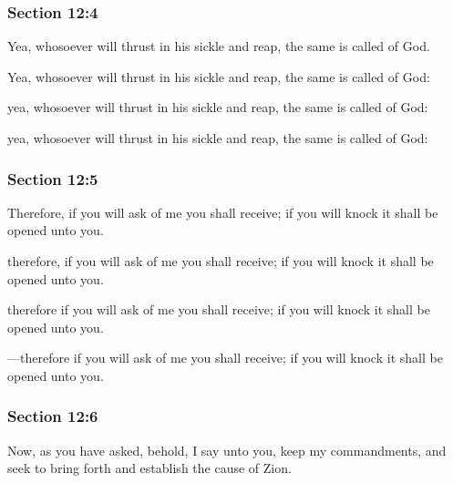 	\subsubsection{Section 12:4} %
		\label{DC12-4}

		Yea, whosoever will thrust in his sickle and reap, the same is called of God.

		\begin{framed}
		\scriptsize
			\begin{compactdesc}
				\item[JSP] Yea, whosoever will thrust in his sickle and reap, the same is called of God: 
				\item[DC 1835] yea, whosoever will thrust in his sickle and reap, the same is called of God:
				\item[DC 1844] yea, whosoever will thrust in his sickle and reap, the same is called of God:
			\end{compactdesc}
		\end{framed}

	\subsubsection{Section 12:5} %
		\label{DC12-5}

		Therefore, if you will ask of me you shall receive; if you will knock it shall be opened unto you.

		\begin{framed}
		\scriptsize
			\begin{compactdesc}
				\item[JSP] therefore, if you will ask of me you shall receive; if you will knock it shall be opened unto you.
				\item[DC 1835] therefore if you will ask of me you shall receive; if you will knock it shall be opened unto you.
				\item[DC 1844] ---therefore if you will ask of me you shall receive; if you will knock it shall be opened unto you.
			\end{compactdesc}
		\end{framed}

	\subsubsection{Section 12:6} %
		\label{DC12-6}

		Now, as you have asked, behold, I say unto you, keep my commandments, and seek to bring forth and establish the cause of Zion.

